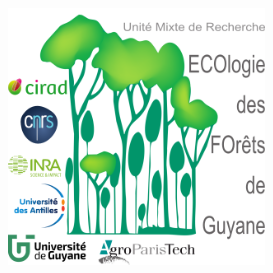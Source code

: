 \documentclass[12pt,]{article}
\theoremstyle{definition}
\theoremstyle{definition}
\theoremstyle{remark}
\begin{document}
  \vspace*{\fill}
  \includegraphics{images/logo}
\end{document}
